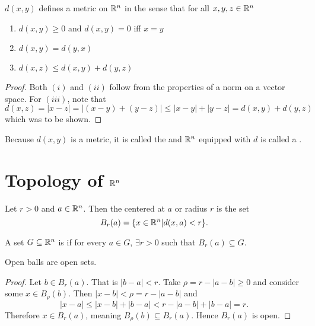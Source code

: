 \documentclass{subfile}
\begin{document}
\begin{theorem}
    $d(x,y)$ defines a metric on $\mathbb{R}^n$ in the sense that for all $x,y,z \in \mathbb{R}^n$
    \begin{enumerate}[label=\roman*)]
        \item $d(x,y) \geq 0$ and $d(x,y) = 0$ iff $x = y$
        \item $d(x,y) = d(y,x)$
        \item $d(x,z) \leq d(x,y) + d(y,z)$
    \end{enumerate}
\end{theorem}

\begin{proof}
    Both $(i)$ and $(ii)$ follow from the properties of a norm on a vector space. For $(iii)$, note that
    \[
        d(x,z) = |x-z| = |(x-y) + (y-z)| \leq |x-y| + |y-z| = d(x,y) + d(y,z)
    \]
    which was to be shown.
\end{proof}

Because $d(x,y)$ is a metric, it is called the  and $\mathbb{R}^n$ equipped with $d$ is called a .

\section{Topology of $\mathbf{\mathbb{R}}^n$}

\begin{definition}
    Let $r > 0$ and $a \in \mathbb{R}^n$. Then the  centered at $a$ or radius $r$ is the set
    \[
        B_{r}(a) = \qty{x \in \mathbb{R}^n \vert d(x,a) < r}
    .\]
\end{definition}

\begin{definition}
    A set $G \subseteq \mathbb{R}^n$ is  if for every $a \in G$, $\exists r > 0$ such that $B_r(a) \subseteq G$.
\end{definition}

\begin{theorem}
    Open balls are open sets.
\end{theorem}

\begin{proof}
    Let $b \in B_r(a)$. That is $|b-a| < r$. Take $\rho = r - |a-b| \geq 0$ and consider some $x \in B_{\rho}(b)$. Then $|x-b| < \rho = r - |a-b|$ and
    \[
        |x-a| \leq |x-b| + |b-a| < r - |a-b| + |b-a| = r
    .\]
    Therefore $x \in B_r(a)$, meaning $B_{\rho}(b) \subseteq B_{r}(a)$. Hence $B_r(a)$ is open.
\end{proof}
\end{document}
